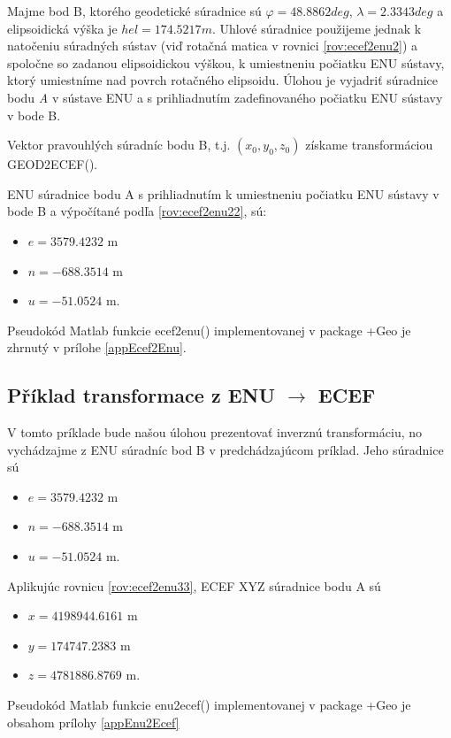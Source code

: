 \documentclass[11pt,a4paper]{article}
\begin{document}
Majme bod B, ktorého geodetické súradnice sú $\varphi = 48.8862 deg$, $\lambda = 2.3343 deg$ a elipsoidická výška je $hel = 174.5217 m$. Uhlové súradnice použijeme jednak k natočeniu súradných sústav (viď rotačná matica v rovnici \ref{rov:ecef2enu2}) a spoločne so zadanou elipsoidickou výškou, k umiestneniu počiatku ENU sústavy, ktorý umiestníme nad povrch rotačného elipsoidu. Úlohou je vyjadriť súradnice bodu \textit{A} v sústave ENU a s prihliadnutím zadefinovaného počiatku ENU sústavy v bode B. 

Vektor pravouhlých súradníc bodu B, t.j. $\left(x_{0}, y_{0}, z_{0}\right)$ získame transformáciou GEOD2ECEF(). 

ENU súradnice bodu A s prihliadnutím k umiestneniu počiatku ENU sústavy v bode B a výpočítané podľa \ref{rov:ecef2enu22}, sú:
\begin{itemize}
\item $e = 3579.4232$ m
\item $n = -688.3514$ m
\item $u = -51.0524$ m.
\end{itemize}

Pseudokód Matlab funkcie ecef2enu() implementovanej v package +Geo je zhrnutý v prílohe \ref{appEcef2Enu}.

\subsection{Příklad transformace z ENU $\rightarrow$ ECEF}

V tomto príklade bude našou úlohou prezentovať inverznú transformáciu, no vychádzajme z ENU súradníc bod B v predchádzajúcom príklad. Jeho súradnice sú
\begin{itemize}
\item $e = 3579.4232$ m
\item $n = -688.3514$ m
\item $u = -51.0524$ m.
\end{itemize}


Aplikujúc rovnicu \ref{rov:ecef2enu33}, ECEF XYZ súradnice bodu A sú
\begin{itemize}
\item $x = 4198944.6161$ m
\item $y = 174747.2383$ m
\item $z = 4781886.8769$ m.
\end{itemize}

Pseudokód Matlab funkcie enu2ecef() implementovanej v package +Geo je obsahom prílohy \ref{appEnu2Ecef}
\end{document}
